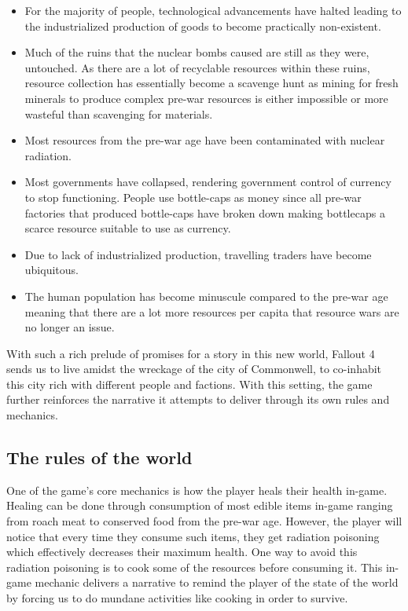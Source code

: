 \documentclass[12pt, conference]{IEEEtran}
\begin{document}
\begin{itemize}
    \item For the majority of people, technological advancements have halted leading to the industrialized production of goods to become practically non-existent.
    \item Much of the ruins that the nuclear bombs caused are still as they were, untouched. As there are a lot of recyclable resources within these ruins, resource collection has essentially become a scavenge hunt as mining for fresh minerals to produce complex pre-war resources is either impossible or more wasteful than scavenging for materials.
    \item Most resources from the pre-war age have been contaminated with nuclear radiation.
    \item Most governments have collapsed, rendering government control of currency to stop functioning. People use bottle-caps as money since all pre-war factories that produced bottle-caps have broken down making bottlecaps a scarce resource suitable to use as currency.
    \item Due to lack of industrialized production, travelling traders have become ubiquitous.
    \item The human population has become minuscule compared to the pre-war age meaning that there are a lot more resources per capita that resource wars are no longer an issue.
\end{itemize}

With such a rich prelude of promises for a story in this new world, Fallout 4 sends us to live amidst the wreckage of the city of Commonwell, to co-inhabit this city rich with different people and factions. With this setting, the game further reinforces the narrative it attempts to deliver through its own rules and mechanics.\\

\subsection{The rules of the world}

One of the game's core mechanics is how the player heals their health in-game. Healing can be done through consumption of most edible items in-game ranging from roach meat to conserved food from the pre-war age. However, the player will notice that every time they consume such items, they get radiation poisoning which effectively decreases their maximum health. One way to avoid this radiation poisoning is to cook some of the resources before consuming it. This in-game mechanic delivers a narrative to remind the player of the state of the world by forcing us to do mundane activities like cooking in order to survive.\\
\end{document}
